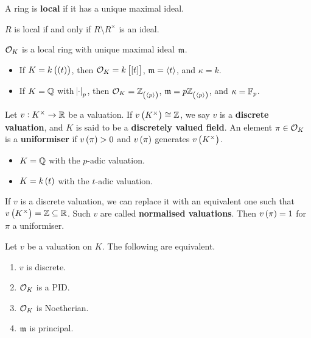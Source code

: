 A ring is \textbf{local} if it has a unique maximal ideal.

\begin{exercise*}
$ R $ is local if and only if $ R \setminus R^\times $ is an ideal.
\end{exercise*}

\begin{corollary}
$ \mathcal{O}_K $ is a local ring with unique maximal ideal $ \mathfrak{m} $.
\end{corollary}

\begin{example*}
\hfill
\begin{itemize}
\item If $ K = k\br{\br{t}} $, then $ \OOO_K = k\sbr{\sbr{t}} $, $ \mathfrak{m} = \left\langle t \right\rangle $, and $ \kappa = k $.
\item If $ K = \mathbb{Q} $ with $ \abs{\cdot}_p $, then $ \OOO_K = \ZZ_{\br{\abr{p}}} $, $ \mmm = p\ZZ_{\br{\abr{p}}} $, and $ \kappa = \mathbb{F}_p $.
\end{itemize}
\end{example*}

\begin{definition}
Let $ v : K^\times \to \mathbb{R} $ be a valuation. If $ v\br{K^\times} \cong \ZZ $, we say $ v $ is a \textbf{discrete valuation}, and $ K $ is said to be a \textbf{discretely valued field}. An element $ \pi \in \mathcal{O}_K $ is a \textbf{uniformiser} if $ v\br{\pi} > 0 $ and $ v\br{\pi} $ generates $ v\br{K^\times} $.
\end{definition}

\begin{example*}
\hfill
\begin{itemize}
\item $ K = \mathbb{Q} $ with the $ p $-adic valuation.
\item $ K = k\br{t} $ with the $ t $-adic valuation.
\end{itemize}
\end{example*}

\pagebreak

\begin{remark*}
If $ v $ is a discrete valuation, we can replace it with an equivalent one such that $ v\br{K^\times} = \ZZ \subseteq \RR $. Such $ v $ are called \textbf{normalised valuations}. Then $ v\br{\pi} = 1 $ for $ \pi $ a uniformiser.
\end{remark*}

\begin{lemma}
\label{lem:2.6}
Let $ v $ be a valuation on $ K $. The following are equivalent.
\begin{enumerate}
\item $ v $ is discrete.
\item $ \mathcal{O}_K $ is a PID.
\item $ \mathcal{O}_K $ is Noetherian.
\item $ \mathfrak{m} $ is principal.
\end{enumerate}
\end{lemma}

